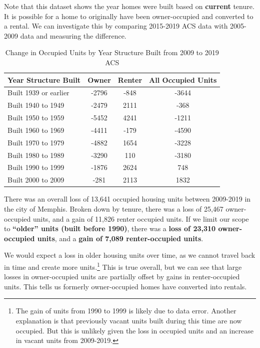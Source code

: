 \documentclass[
  openany]{book}
\begin{document}
Note that this dataset shows the year homes were built based on \textbf{current} tenure. It is possible for a home to originally have been owner-occupied and converted to a rental. We can investigate this by comparing 2015-2019 ACS data with 2005-2009 data and measuring the difference.

\begin{table}

\caption{\label{tab:tbl-yrblt-diff}Change in Occupied Units by Year Structure Built from 2009 to 2019 ACS}
\centering
\begin{tabular}[t]{l|c|c|c}
\hline
Year Structure Built & Owner & Renter & All Occupied Units\\
\hline
Built 1939 or earlier & -2796 & -848 & -3644\\
\hline
Built 1940 to 1949 & -2479 & 2111 & -368\\
\hline
Built 1950 to 1959 & -5452 & 4241 & -1211\\
\hline
Built 1960 to 1969 & -4411 & -179 & -4590\\
\hline
Built 1970 to 1979 & -4882 & 1654 & -3228\\
\hline
Built 1980 to 1989 & -3290 & 110 & -3180\\
\hline
Built 1990 to 1999 & -1876 & 2624 & 748\\
\hline
Built 2000 to 2009 & -281 & 2113 & 1832\\
\hline
\end{tabular}
\end{table}

There was an overall loss of 13,641 occupied housing units between 2009-2019 in the city of Memphis. Broken down by tenure, there was a loss of 25,467 owner-occupied units, and a gain of 11,826 renter occupied units. If we limit our scope to \textbf{``older'' units (built before 1990)}, there was a \textbf{loss of 23,310 owner-occupied units}, and a \textbf{gain of 7,089 renter-occupied units}.

We would expect a loss in older housing units over time, as we cannot travel back in time and create more units.\footnote{The gain of units from 1990 to 1999 is likely due to data error. Another explanation is that previously vacant units built during this time are now occupied. But this is unlikely given the loss in occupied units and an increase in vacant units from 2009-2019.} This is true overall, but we can see that large losses in owner-occupied units are partially offset by gains in renter-occupied units. This tells us formerly owner-occupied homes have converted into rentals.
\end{document}
